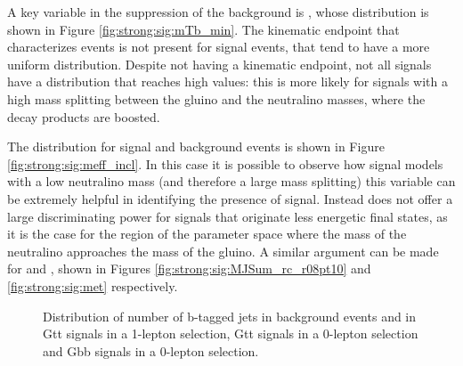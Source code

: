 A key variable in the suppression of the \ttbar background is \mtb, whose distribution is shown in Figure \ref{fig:strong:sig:mTb_min}.
The kinematic endpoint that characterizes \ttbar events is not present for signal events, that tend to have a more uniform distribution.
Despite not having a kinematic endpoint, not all signals have a \mtb distribution that reaches high values: this is more likely for 
signals with a high mass splitting between the gluino and the neutralino masses, where the decay products are boosted.

The \meff distribution for signal and background events is shown in Figure \ref{fig:strong:sig:meff_incl}. 
In this case it is possible to observe how signal models with a low neutralino mass (and therefore a large mass splitting)
this variable can be extremely helpful in identifying the presence of signal. 
Instead \meff does not offer a large discriminating power for signals that originate less energetic final states, as it is the 
case for the region of the parameter space where the mass of the neutralino approaches the mass of the gluino.
A similar argument can be made for \mjsum and \met, shown in Figures \ref{fig:strong:sig:MJSum_rc_r08pt10} and \ref{fig:strong:sig:met} respectively. 


\begin{figure}[h]
\centering 
{}
\caption{Distribution of number of b-tagged jets in background events and in  Gtt signals in a 1-lepton selection,
 Gtt signals in a 0-lepton selection and
 Gbb signals in a 0-lepton selection.
}\label{fig:strong:sig:bjets_n}
\end{figure}

